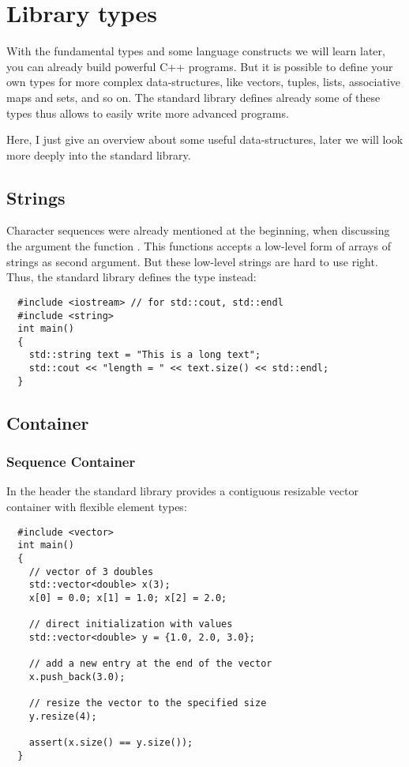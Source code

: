 \section{Library types}
With the fundamental types and some language constructs we will learn later, you can already build powerful C++ programs. But it is possible
to define your own types for more complex data-structures, like vectors, tuples, lists, associative maps and sets, and so on. The standard library
defines already some of these types thus allows to easily write more advanced programs.

Here, I just give an overview about some useful data-structures, later we will look more deeply into the standard library.

\subsection{Strings}
Character sequences were already mentioned at the beginning, when discussing the argument the function . This
functions accepts a low-level form of arrays of strings as second argument. But these low-level strings are hard to use right. Thus,
the standard library defines the type  instead:
\begin{verbatim}
  #include <iostream> // for std::cout, std::endl
  #include <string>
  int main()
  {
    std::string text = "This is a long text";
    std::cout << "length = " << text.size() << std::endl;
  }
\end{verbatim}

\subsection{Container}
\subsubsection{Sequence Container}
In the header  the standard library provides a contiguous resizable vector container with flexible element types:
\begin{verbatim}
  #include <vector>
  int main()
  {
    // vector of 3 doubles
    std::vector<double> x(3);
    x[0] = 0.0; x[1] = 1.0; x[2] = 2.0;

    // direct initialization with values
    std::vector<double> y = {1.0, 2.0, 3.0};

    // add a new entry at the end of the vector
    x.push_back(3.0);

    // resize the vector to the specified size
    y.resize(4);

    assert(x.size() == y.size());
  }
\end{verbatim}

